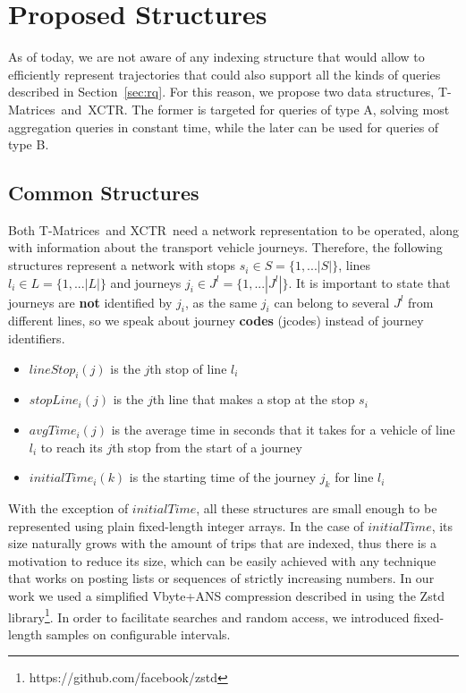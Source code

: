 \documentclass[runningheads]{llncs}
\newcommand{\acumm}{T-Matrices} %
\newcommand{\ctr}{XCTR}
\begin{document}
\section{Proposed Structures}
\label{sec:ps}
As of today, we are not aware of any indexing structure that would allow to efficiently represent trajectories that could also support all the kinds of queries described in Section~\ref{sec:rq}. For this reason, we propose two data structures, \acumm~and~\ctr. The former is targeted for queries of type A, solving most aggregation queries in constant time, while the later can be used for queries of type B.

\subsection{Common Structures}
\label{sec:cs}
Both \acumm~and \ctr~need a network representation to be operated, along with information about the transport vehicle journeys. Therefore, the following structures represent a network with stops $s_i \in S = \{1,...|S|\}$, lines $l_i \in L = \{1,...|L|\}$ and journeys $j_i \in J^l = \{1,...|J^l|\}$. It is important to state that journeys are \textbf{not} identified by $j_i$, as the same $j_i$ can belong to several $J^l$ from different lines, so we speak about journey \textbf{codes} (jcodes) instead of journey identifiers.

\begin{itemize}
    \item $lineStop_i(j)$ is the $j$th stop of line $l_i$
    \item $stopLine_i(j)$ is the $j$th line that makes a stop at the stop $s_i$
    \item $avgTime_i(j)$ is the average time in seconds that it takes for a vehicle of line $l_i$ to reach its $j$th stop from the start of a journey
    \item $initialTime_i(k)$ is the starting time of the journey $j_k$ for line $l_i$
\end{itemize}

With the exception of $initialTime$, all these structures are small enough to be represented using plain fixed-length integer arrays. In the case of $initialTime$, its size naturally grows with the amount of trips that are indexed, thus there is a motivation to reduce its size, which can be easily achieved with any technique that works on posting lists or sequences of strictly increasing numbers. In our work we used a simplified Vbyte+ANS compression described in \cite{moffat2017ans} using the Zstd library\footnote{https://github.com/facebook/zstd}. In order to facilitate searches and random access, we introduced fixed-length samples on configurable intervals.
\end{document}
